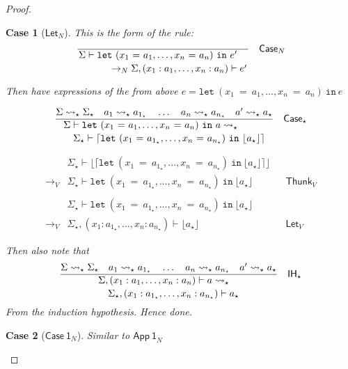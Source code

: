 \documentclass[float=false, crop=false]{standalone}
\newtheorem{case}{Case}
\numberwithin{subcase}{case}
\newcommand{\tlang}{\star}
\newcommand{\thunk}[1]{\lceil #1 \rceil}
\newcommand{\unwrap}[1]{\lfloor #1 \rfloor}
\newcommand{\tcbn}{\rightarrow_N}
\newcommand{\tcbv}{\rightarrow_V}
\newcommand{\tlthunk}{\rightsquigarrow_\tlang}
\begin{document}
\begin{proof}
\begin{case}[$\mathsf{Let}_N$]
    This is the form of the rule:
    \[
  \dfrac{}{\splitdfrac{\Sigma \vdash \mathtt{let}\ 
      (x_1\ \mathtt{=}\ a_1,\dotsc, x_n\ \mathtt{=}\ a_n)\ \mathtt{in}\ e'}
    {\tcbn \Sigma,(x_1:a_1,\dotsc,x_n:a_n) \vdash e'}} \quad \mathsf{Case}_N\]

  Then have expressions of the from above 
  $e = \mathtt{let}\ (x_1\ \mathtt{=}\ a_1,\dotsc, x_n\ \mathtt{=}\ a_n)\ \mathtt{in}\ e$
  
\[\dfrac{\Sigma \tlthunk \Sigma_\tlang \quad a_1  \tlthunk a_{1_\tlang} 
    \quad \dots \quad a_n \tlthunk a_{n_\tlang} \quad a' \tlthunk a_\tlang}
  {\splitdfrac{\Sigma \vdash \mathtt{let}\ (x_1\ \mathtt{=}\ a_1,\dotsc, 
      x_n\ \mathtt{=}\ a_n)\ \mathtt{in}\ a \tlthunk}
    {\Sigma_\tlang \vdash \thunk{\mathtt{let}\ 
        (x_1\ \mathtt{=}\ a_{1_\tlang},\dotsc, x_n\ \mathtt{=}\ a_{n_\tlang})
        \ \mathtt{in}\ \unwrap{a_\tlang}}}} \quad \mathsf{Case}_\tlang\]

\begin{align*} 
  & \Sigma_\tlang \vdash \unwrap{\thunk{\mathtt{let}\ 
        (x_1\ \mathtt{=}\ a_{1_\tlang},\dotsc, x_n\ \mathtt{=}\ a_{n_\tlang})
        \ \mathtt{in}\ \unwrap{a_\tlang}}}\\ \tcbv &\Sigma_\tlang \vdash
    \mathtt{let}\ (x_1\ \mathtt{=}\ a_{1_\tlang},
    \dotsc, x_n\ \mathtt{=}\ a_{n_\tlang})
    \ \mathtt{in}\ \unwrap{a_\tlang} && \mathsf{Thunk}_V \\ \\
  & \Sigma_\tlang \vdash \mathtt{let}\ 
    (x_1\ \mathtt{=}\ a_{1_\tlang},\dotsc, x_n\ \mathtt{=}\ a_{n_\tlang})
    \ \mathtt{in}\ \unwrap{a_\tlang}\\ \tcbv &\Sigma_\tlang,
    (x_1:a_{1_\tlang},\dotsc,x_n:a_{n_\tlang}) \vdash 
    \unwrap{a_\tlang} && \mathsf{Let}_V
\end{align*}

Then also note that 
\[
  \dfrac{\Sigma \tlthunk \Sigma_\tlang \quad a_1  
    \tlthunk a_{1_\tlang} \quad \dots \quad a_n 
    \tlthunk a_{n_\tlang} \quad a' \tlthunk a_\tlang}
  {\splitdfrac{\Sigma,(x_1:a_1,\dotsc,x_n:a_n) \vdash a \tlthunk}
   {\Sigma_\tlang,(x_1:a_{1_\tlang},\dotsc,x_n:a_{n_\tlang}) \vdash a_\tlang} }
    \quad \mathsf{IH}_\tlang\] From the induction hypothesis.
    Hence done.
\end{case}

\begin{case}[$\mathsf{Case\ 1}_N$]
Similar to $\mathsf{App\ 1}_N$
\end{case}


\end{proof}
\end{document}
